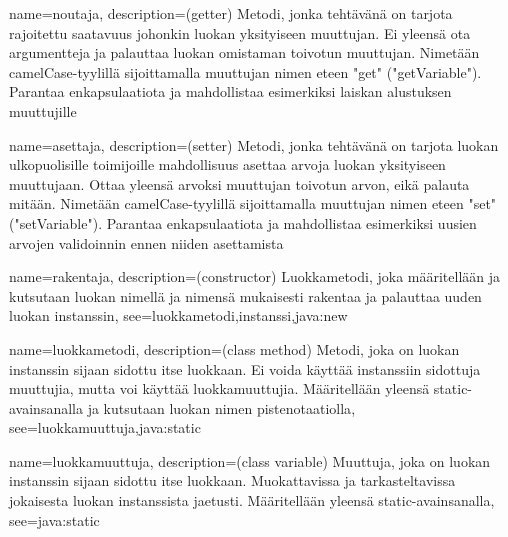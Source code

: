 {
	name=noutaja,
	description={(getter) Metodi, jonka tehtävänä on tarjota rajoitettu saatavuus johonkin
luokan yksityiseen muuttujan. Ei yleensä ota argumentteja ja palauttaa luokan omistaman toivotun
muuttujan. Nimetään camelCase-tyylillä sijoittamalla muuttujan nimen eteen "get" ("getVariable").
Parantaa enkapsulaatiota ja mahdollistaa esimerkiksi laiskan alustuksen muuttujille}
}

{
	name=asettaja,
	description={(setter) Metodi, jonka tehtävänä on tarjota luokan ulkopuolisille toimijoille
mahdollisuus asettaa arvoja luokan yksityiseen muuttujaan. Ottaa yleensä arvoksi muuttujan toivotun
arvon, eikä palauta mitään. Nimetään camelCase-tyylillä sijoittamalla muuttujan nimen eteen "set"
("setVariable"). Parantaa enkapsulaatiota ja mahdollistaa esimerkiksi uusien arvojen validoinnin
ennen niiden asettamista}
}

{
	name=rakentaja,
	description={(constructor) Luokkametodi, joka määritellään ja kutsutaan luokan nimellä ja nimensä
mukaisesti rakentaa ja palauttaa uuden luokan instanssin},
	see={luokkametodi,instanssi,java:new}
}

{
	name=luokkametodi,
	description={(class method) Metodi, joka on luokan instanssin sijaan sidottu itse luokkaan.
Ei voida käyttää instanssiin sidottuja muuttujia, mutta voi käyttää luokkamuuttujia. Määritellään
yleensä static-avainsanalla ja kutsutaan luokan nimen pistenotaatiolla},
	see={luokkamuuttuja,java:static}
}

{
	name=luokkamuuttuja,
	description={(class variable) Muuttuja, joka on luokan instanssin sijaan sidottu itse luokkaan.
Muokattavissa ja tarkasteltavissa jokaisesta luokan instanssista jaetusti. Määritellään yleensä
static-avainsanalla},
	see=java:static
}